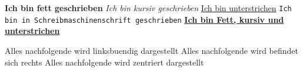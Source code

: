 \textbf{Ich bin fett geschrieben} 
\textit{Ich bin kursiv geschrieben} 
\underline{Ich bin unterstrichen} 
\texttt{Ich bin in Schreibmaschinenschrift geschrieben} 
\underline{\textbf{Ich bin Fett, kursiv und 
unterstrichen}}

\flushleft Alles nachfolgende wird linksbuendig dargestellt 
\flushright Alles nachfolgende wird befindet sich rechts
\centering Alles nachfolgende wird zentriert dargestellt
